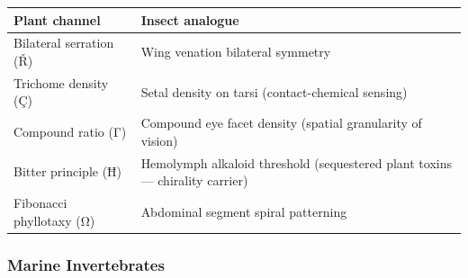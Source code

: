 \begin{longtable}[]{@{}ll@{}}
\toprule
\begin{minipage}[b]{0.47\columnwidth}\raggedright
Plant channel\strut
\end{minipage} & \begin{minipage}[b]{0.47\columnwidth}\raggedright
Insect analogue\strut
\end{minipage}\tabularnewline
\midrule
\endhead
\begin{minipage}[t]{0.47\columnwidth}\raggedright
Bilateral serration (Ř)\strut
\end{minipage} & \begin{minipage}[t]{0.47\columnwidth}\raggedright
Wing venation bilateral symmetry\strut
\end{minipage}\tabularnewline
\begin{minipage}[t]{0.47\columnwidth}\raggedright
Trichome density (Ç)\strut
\end{minipage} & \begin{minipage}[t]{0.47\columnwidth}\raggedright
Setal density on tarsi (contact-chemical sensing)\strut
\end{minipage}\tabularnewline
\begin{minipage}[t]{0.47\columnwidth}\raggedright
Compound ratio (Γ)\strut
\end{minipage} & \begin{minipage}[t]{0.47\columnwidth}\raggedright
Compound eye facet density (spatial granularity of vision)\strut
\end{minipage}\tabularnewline
\begin{minipage}[t]{0.47\columnwidth}\raggedright
Bitter principle (Ħ)\strut
\end{minipage} & \begin{minipage}[t]{0.47\columnwidth}\raggedright
Hemolymph alkaloid threshold (sequestered plant toxins --- chirality
carrier)\strut
\end{minipage}\tabularnewline
\begin{minipage}[t]{0.47\columnwidth}\raggedright
Fibonacci phyllotaxy (Ω)\strut
\end{minipage} & \begin{minipage}[t]{0.47\columnwidth}\raggedright
Abdominal segment spiral patterning\strut
\end{minipage}\tabularnewline
\bottomrule
\end{longtable}

\hypertarget{marine-invertebrates}{%
\subsubsection{Marine Invertebrates}\label{marine-invertebrates}}

